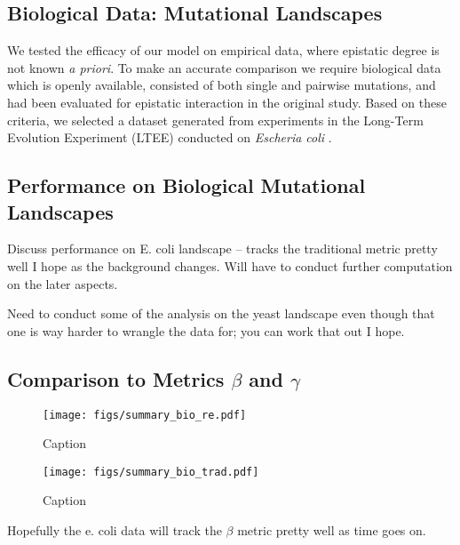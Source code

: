 \subsection{Biological Data: Mutational Landscapes}


We tested the efficacy of our model on empirical data, where epistatic degree is not known \textit{a priori}. To make an accurate comparison we require biological data which is openly available, consisted of both single and pairwise mutations, and had been evaluated for epistatic interaction in the original study. Based on these criteria, we selected a dataset generated from experiments in the Long-Term Evolution Experiment (LTEE) conducted on \textit{Escheria coli} \citep{khan_negative_2011}. 



\subsection{Performance on Biological Mutational Landscapes}

Discuss performance on E. coli landscape -- tracks the traditional metric pretty well I hope as the background changes. Will have to conduct further computation on the later aspects.

Need to conduct some of the analysis on the yeast landscape even though that one is way harder to wrangle the data for; you can work that out I hope. 


\subsection{Comparison to Metrics $\beta$ and $\gamma$}

\begin{figure}
    \centering
    \texttt{[image: figs/summary\_bio\_re.pdf]}
    \caption{Caption}
    \label{fig:my_label}
\end{figure}


\begin{figure}
    \centering
    \texttt{[image: figs/summary\_bio\_trad.pdf]}
    \caption{Caption}
    \label{fig:my_label}
\end{figure}

Hopefully the e. coli data will track the $\beta$ metric pretty well as time goes on.